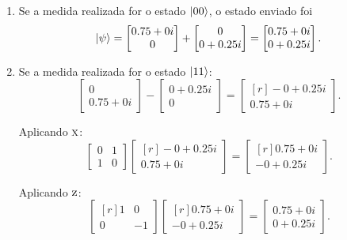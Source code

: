\begin{enumerate}
  \item Se a medida realizada for o estado $\ket{00}$, o estado enviado foi
        \[\ket{\psi} = \begin{bmatrix} {0.75+0i} \\ 0 \end{bmatrix} + \begin{bmatrix} 0 \\ {0+0.25i} \end{bmatrix} = \begin{bmatrix} {0.75+0i} \\ {0+0.25i} \end{bmatrix}. \]

  \item Se a medida realizada for o estado $\ket{11}$:
        \[
        \begin{bmatrix} 0 \\ {0.75+0i} \end{bmatrix} - \begin{bmatrix} {0+0.25i} \\ 0 \end{bmatrix} = \begin{bmatrix*}[r] -{0+0.25i} \\ {0.75+0i} \end{bmatrix*}.
        \]

        Aplicando \(\operatorname{\textsc{x}}\):
        \[
        \begin{bmatrix} 0 & 1 \\ 1 & 0 \end{bmatrix} \begin{bmatrix*}[r] -{0+0.25i} \\ {0.75+0i} \end{bmatrix*} = \begin{bmatrix*}[r] {0.75+0i} \\ -{0+0.25i} \end{bmatrix*}.
        \]

        Aplicando \(\operatorname{\textsc{z}}\):
        \[
        \begin{bmatrix*}[r] 1 & 0 \\ 0 & -1 \end{bmatrix*}\begin{bmatrix*}[r] {0.75+0i} \\ -{0+0.25i} \end{bmatrix*} = \begin{bmatrix} {0.75+0i} \\ {0+0.25i} \end{bmatrix}.
        \]


\end{enumerate}
